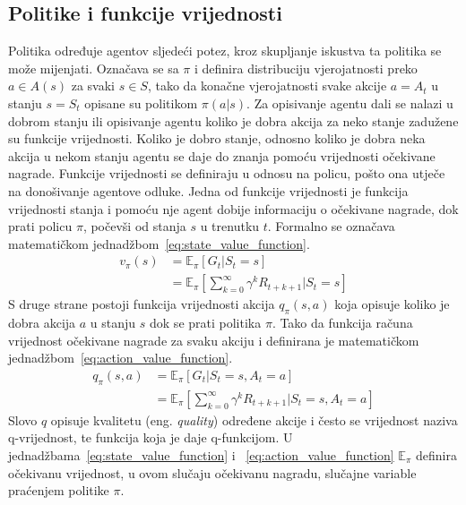 \subsection{Politike i funkcije vrijednosti}
Politika određuje agentov sljedeći potez, kroz skupljanje iskustva ta politika se može mijenjati. Označava se sa $\pi$ i definira distribuciju vjerojatnosti preko $a \in A(s)$ za svaki $s \in S$, tako da konačne vjerojatnosti svake akcije $a = A_t$ u stanju $s = S_t$ opisane su politikom $\pi(a|s)$.
Za opisivanje agentu dali se nalazi u dobrom stanju ili opisivanje agentu koliko je dobra akcija za neko stanje zadužene su funkcije vrijednosti. Koliko je dobro stanje, odnosno koliko je dobra neka akcija u nekom stanju agentu se daje do znanja pomoću vrijednosti očekivane nagrade. Funkcije vrijednosti se definiraju u odnosu na policu, pošto ona utječe na donošivanje agentove odluke.
Jedna od funkcije vrijednosti je funkcija vrijednosti stanja i pomoću nje agent dobije informaciju o očekivane nagrade, dok prati policu $\pi$, počevši od stanja $s$ u trenutku $t$. Formalno se označava matematičkom jednadžbom~\ref{eq:state_value_function}.
\begin{equation}\label{eq:state_value_function}
	\begin{split}
		v_\pi(s) &= \mathbb{E}_\pi[G_t | S_t = s] \\
				 &= \mathbb{E}_\pi\left[\sum_{k=0}^{\infty} \gamma^k R_{t+k+1} | S_t = s\right]
     \end{split}
\end{equation}
S druge strane postoji funkcija vrijednosti akcija $q_\pi(s, a)$ koja opisuje koliko je dobra akcija $a$ u stanju $s$ dok se prati politika $\pi$. Tako da funkcija računa vrijednost očekivane nagrade za svaku akciju i definirana je matematičkom jednadžbom~\ref{eq:action_value_function}.
\begin{equation}\label{eq:action_value_function}
\begin{split}
q_\pi(s, a) &= \mathbb{E}_\pi[G_t | S_t = s, A_t = a] \\
&= \mathbb{E}_\pi\left[\sum_{k=0}^{\infty} \gamma^k R_{t+k+1} | S_t = s, A_t = a\right]
\end{split}
\end{equation}
Slovo $q$ opisuje kvalitetu (eng. \textit{quality}) određene akcije i često se vrijednost naziva q-vrijednost, te funkcija koja je daje q-funkcijom. U jednadžbama~\ref{eq:state_value_function} i ~\ref{eq:action_value_function} $\mathbb{E}_\pi$ definira očekivanu vrijednost, u ovom slučaju očekivanu nagradu, slučajne variable praćenjem politike $\pi$.

